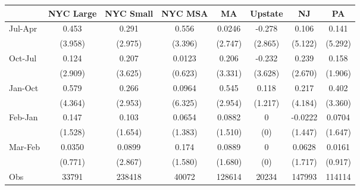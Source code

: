 {
\def\sym#1{\ifmmode^{#1}\else\(^{#1}\)\fi}
\begin{tabular}{l*{7}{c}}
\hline\hline
                    &\multicolumn{1}{c}{NYC Large}&\multicolumn{1}{c}{NYC Small}&\multicolumn{1}{c}{NYC MSA}&\multicolumn{1}{c}{MA}&\multicolumn{1}{c}{Upstate}&\multicolumn{1}{c}{NJ}&\multicolumn{1}{c}{PA}\\
\hline
Jul-Apr             &       0.453         &       0.291         &       0.556         &      0.0246         &      -0.278         &       0.106         &       0.141         \\
                    &     (3.958)         &     (2.975)         &     (3.396)         &     (2.747)         &     (2.865)         &     (5.122)         &     (5.292)         \\
[1em]
Oct-Jul             &       0.124         &       0.207         &      0.0123         &       0.206         &      -0.232         &       0.239         &       0.158         \\
                    &     (2.909)         &     (3.625)         &     (0.623)         &     (3.331)         &     (3.628)         &     (2.670)         &     (1.906)         \\
[1em]
Jan-Oct             &       0.579         &       0.266         &      0.0964         &       0.545         &       0.118         &       0.217         &       0.402         \\
                    &     (4.364)         &     (2.953)         &     (6.325)         &     (2.954)         &     (1.217)         &     (4.184)         &     (3.360)         \\
[1em]
Feb-Jan             &       0.147         &       0.103         &      0.0654         &      0.0882         &           0         &     -0.0222         &      0.0704         \\
                    &     (1.528)         &     (1.654)         &     (1.383)         &     (1.510)         &         (0)         &     (1.447)         &     (1.647)         \\
[1em]
Mar-Feb             &      0.0350         &      0.0899         &       0.174         &      0.0889         &           0         &      0.0628         &      0.0161         \\
                    &     (0.771)         &     (2.867)         &     (1.580)         &     (1.680)         &         (0)         &     (1.717)         &     (0.917)         \\
\hline
Obs        &       33791         &      238418         &       40072         &      128614         &       20234         &      147993         &      114114         \\
\hline\hline
\end{tabular}
}
